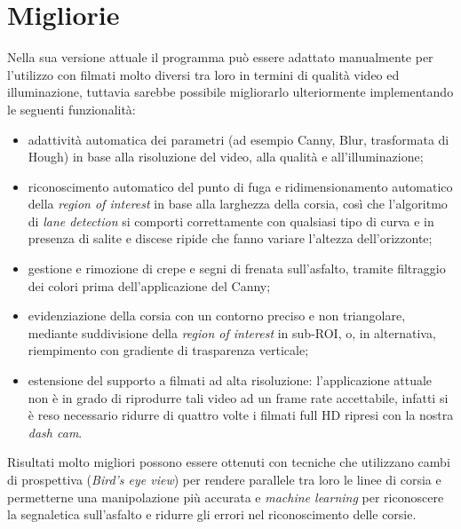 \documentclass[12pt]{article}
\begin{document}
\section{Migliorie}
\hspace{0.2cm} Nella sua versione attuale il programma può essere adattato manualmente per l'utilizzo con filmati molto diversi tra loro in termini di qualità video ed illuminazione, tuttavia sarebbe possibile migliorarlo ulteriormente implementando le seguenti funzionalità:
\begin{itemize}
\item adattività automatica dei parametri (ad esempio Canny, Blur, trasformata di Hough) in base alla risoluzione del video, alla qualità e all'illuminazione;
\item riconoscimento automatico del punto di fuga e ridimensionamento automatico della \textit{region of interest} in base alla larghezza della corsia, così che l'algoritmo di \textit{lane detection} si comporti correttamente con qualsiasi tipo di curva e in presenza di salite e discese ripide che fanno variare l'altezza dell'orizzonte;
\item gestione e rimozione di crepe e segni di frenata sull'asfalto, tramite filtraggio dei colori prima dell'applicazione del Canny;
\item evidenziazione della corsia con un contorno preciso e non triangolare, mediante suddivisione della \textit{region of interest} in sub-ROI, o, in alternativa, riempimento con gradiente di trasparenza verticale;
\item estensione del supporto a filmati ad alta risoluzione: l'applicazione attuale non è in grado di riprodurre tali video ad un frame rate accettabile, infatti si è reso necessario ridurre di quattro volte i filmati full HD ripresi con la nostra \textit{dash cam}.
\end{itemize}

\hspace{0.2cm}Risultati molto migliori possono essere ottenuti con tecniche che utilizzano cambi di prospettiva (\textit{Bird's eye view}) per rendere parallele tra loro le linee di corsia e permetterne una manipolazione più accurata e \textit{machine learning} per riconoscere la segnaletica sull'asfalto e ridurre gli errori nel riconoscimento delle corsie.
\end{document}
